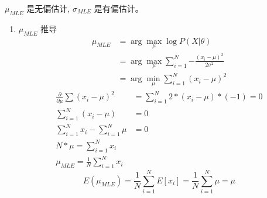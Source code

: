 \documentclass[11pt]{article}
\begin{document}
\(\mu_{MLE}\) 是无偏估计, \(\sigma_{MLE}\) 是有偏估计。
\begin{enumerate}
\item \(\mu_{MLE}\) 推导
\label{sec:org9000bbb}
\begin{equation}
\begin{align}
\label{eq:5}
\mu_{MLE} &= \arg \max_{\mu} \log P(X|\theta) \\
&= \arg \max_{\mu} \sum\limits_{i=1}^N {-\frac{\left( x_i -\mu \right)^2}{2\sigma^2}}\\
&= \arg \min_{\mu} \sum\limits_{i=1}^N {\left( x_i - \mu \right)^2}
\end{align}
\end{equation}
\begin{equation}
\label{eq:6}
\begin{align}
\frac{\partial}{\partial \mu} \sum \left( x_i - \mu \right)^2 &= \sum\limits_{i=1}^N 2*\left( x_i - \mu \right)*(-1) = 0\\
\sum\limits_{i=1}^N \left( x_i - \mu \right) &= 0 \\
\sum\limits_{i=1}^N x_i - \sum\limits_{i=1}^N \mu &= 0 \\
N*\mu = \sum\limits_{i=1}^N x_i &\\
\mu_{MLE} = \frac{1}{N} \sum\limits_{i=1}^N x_i & 
\end{align}
\end{equation}
\[
E \left( \mu_{MLE} \right) = \frac{1}{N} \sum\limits_{i=1}^N E[x_i]  = \frac{1}{N} \sum\limits_{i=1}^{N} \mu = \mu 
\]


\end{enumerate}
\end{document}
